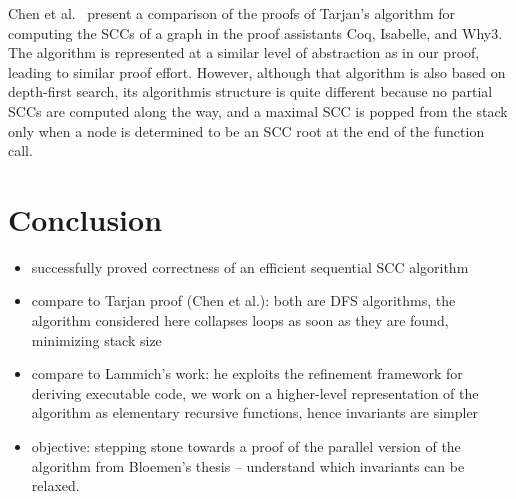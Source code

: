 \documentclass[sigplan,10pt,anonymous,review]{acmart}
\begin{document}
Chen et al.~\cite{chen:tarjan} present a comparison of the proofs of Tarjan's algorithm for computing the SCCs of a graph in the proof assistants Coq, Isabelle, and Why3. The algorithm is represented at a similar level of abstraction as in our proof, leading to similar proof effort. However, although that algorithm is also based on depth-first search, its algorithmis structure is quite different because no partial SCCs are computed along the way, and a maximal SCC is popped from the stack only when a node is determined to be an SCC root at the end of the function call.


\section{Conclusion}
\label{sec:conclusion}

\begin{itemize}
\item successfully proved correctness of an efficient sequential SCC algorithm
\item compare to Tarjan proof (Chen et al.): both are DFS algorithms, the algorithm considered here collapses loops as soon as they are found, minimizing stack size
\item compare to Lammich's work: he exploits the refinement framework for deriving executable code, we work on a higher-level representation of the algorithm as elementary recursive functions, hence invariants are simpler
\item objective: stepping stone towards a proof of the parallel version of the algorithm from Bloemen's thesis -- understand which invariants can be relaxed.
\end{itemize}




\end{document}
